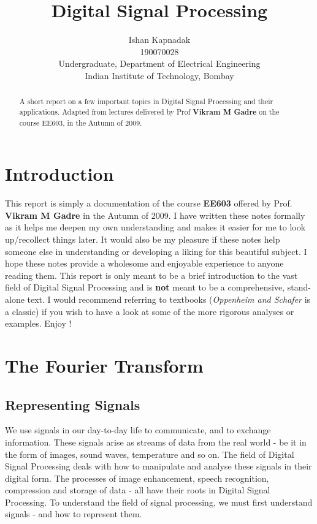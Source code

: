 \documentclass{article}
\title{Digital Signal Processing}
\author{
  Ishan Kapnadak\\
  190070028\\
  Undergraduate, Department of Electrical Engineering\\
  Indian Institute of Technology, Bombay\\
}
\theoremstyle{definition}
\begin{document}
\maketitle
\begin{adjustwidth}{10mm}{10mm}
	\begin{abstract}
	\centering
		A short report on a few important topics in Digital Signal Processing and their applications. Adapted from lectures delivered by Prof \textbf{Vikram M Gadre} on the course EE603, in the Autumn of 2009.
	\end{abstract}
\end{adjustwidth}
\tableofcontents
\bigskip
\section{Introduction}
This report is simply a documentation of the course \textbf{EE603} offered by Prof. \textbf{Vikram M Gadre} in the Autumn of 2009. I have written these notes formally as it helps me deepen my own understanding and makes it easier for me to look up/recollect things later. It would also be my pleasure if these notes help someone else in understanding or developing a liking for this beautiful subject. I hope these notes provide a wholesome and enjoyable experience to anyone reading them. This report is only meant to be a brief introduction to the vast field of Digital Signal Processing and is \textbf{not} meant to be a comprehensive, stand-alone text. I would recommend referring to textbooks (\textit{Oppenheim and Schafer} is a classic) if you wish to have a look at some of the more rigorous analyses or examples. Enjoy ! \medskip


\section{The Fourier Transform}
\subsection{Representing Signals}
	We use signals in our day-to-day life to communicate, and to exchange information. These signals arise as streams of data from the real world - be it in the form of images, sound waves, temperature and so on. The field of Digital Signal Processing deals with how to manipulate and analyse these signals in their digital form. The processes of image enhancement, speech recognition, compression and storage of data - all have their roots in Digital Signal Processing. To understand the field of signal processing, we must first understand signals - and how to represent them. \smallskip
\end{document}
